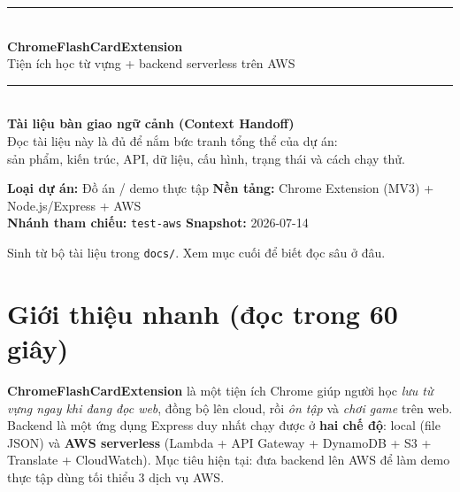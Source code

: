 \documentclass[11pt,a4paper]{article}
\newcommand{\code}[1]{\texttt{#1}}
\begin{document}
\begin{titlepage}
\centering
\vspace*{2.2cm}

{\color{accent}\rule{\linewidth}{2pt}}\\[0.5cm]
{\Huge\bfseries ChromeFlashCardExtension}\\[0.35cm]
{\Large\color{muted} Tiện ích học từ vựng + backend serverless trên AWS}\\[0.3cm]
{\color{accent}\rule{\linewidth}{2pt}}\\[1.4cm]

{\large\bfseries Tài liệu bàn giao ngữ cảnh (Context Handoff)}\\[0.4cm]
{\color{muted} Đọc tài liệu này là đủ để nắm bức tranh tổng thể của dự án:\\
sản phẩm, kiến trúc, API, dữ liệu, cấu hình, trạng thái và cách chạy thử.}\\[2.2cm]

\begin{tcolorbox}[width=0.8\linewidth, colback=accentsoft, colframe=accent,
  boxrule=0.8pt, arc=3pt]
\centering\small
\textbf{Loại dự án:} Đồ án / demo thực tập \quad\textbullet\quad
\textbf{Nền tảng:} Chrome Extension (MV3) + Node.js/Express + AWS\\[2pt]
\textbf{Nhánh tham chiếu:} \code{test-aws} \quad\textbullet\quad
\textbf{Snapshot:} 2026-07-14
\end{tcolorbox}

\vfill
{\color{muted}\small Sinh từ bộ tài liệu trong \code{docs/}. Xem mục cuối để biết đọc sâu ở đâu.}
\end{titlepage}

\tableofcontents
\newpage

\section{Giới thiệu nhanh (đọc trong 60 giây)}

\begin{note}[TL;DR — Dự án này là gì?]
\textbf{ChromeFlashCardExtension} là một tiện ích Chrome giúp người học \emph{lưu từ vựng
ngay khi đang đọc web}, đồng bộ lên cloud, rồi \emph{ôn tập} và \emph{chơi game} trên web.
Backend là một ứng dụng Express duy nhất chạy được ở \textbf{hai chế độ}: local (file JSON)
và \textbf{AWS serverless} (Lambda + API Gateway + DynamoDB + S3 + Translate + CloudWatch).
Mục tiêu hiện tại: đưa backend lên AWS để làm demo thực tập dùng tối thiểu 3 dịch vụ AWS.
\end{note}
\end{document}
